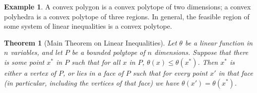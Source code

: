 \documentclass[a4paper,leqno]{article}
\numberwithin{equation}{section}
\newtheorem{thm}[equation]{Theorem}
\theoremstyle{definition}
\newtheorem{ex}[equation]{Example}
\theoremstyle{remark}
\begin{document}
\begin{ex}
  A convex polygon is a convex polytope of two dimensions; a convex polyhedra is a convex polytope of three regions. In general, the
  feasible region of some system of linear inequalities is a convex polytope.
\end{ex}

\begin{thm}[Main Theorem on Linear Inequalities]
  Let $ \theta $ be a linear function in $ n $ variables, and let $ P $ be a bounded polytope of $ n $ dimensions. Suppose that there is some point $ x^* $
  in $ P $ such that for all $ x $ in $ P $, $ \theta(x) \leq \theta(x^*) $. Then $ x^* $ is either a vertex of $ P $, or lies in a face of $ P $ such that
  for every point $ x' $ in that face (in particular, including the vertices of that face) we have $ \theta(x') = \theta(x^*) $.
\end{thm}
\end{document}
